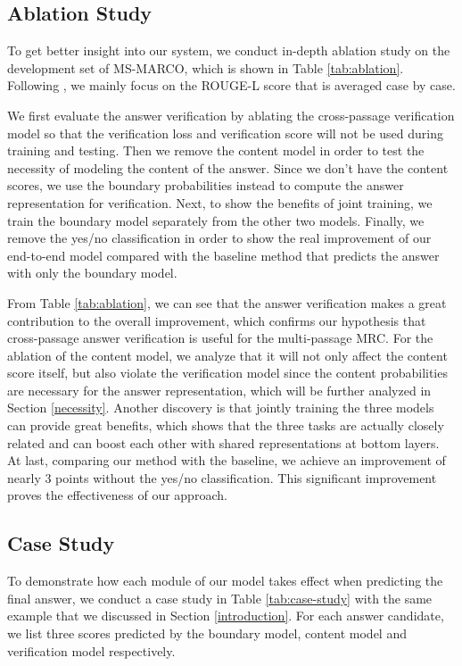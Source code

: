 \documentclass[11pt,a4paper]{article}
\newcommand{\tabref}[1]{Table \ref{#1}}
\newcommand{\secref}[1]{Section \ref{#1}}
\begin{document}
\subsection{Ablation Study}






To get better insight into our system, we conduct in-depth ablation study on the development set of MS-MARCO, which is shown in \tabref{tab:ablation}. Following , we mainly focus on the ROUGE-L score that is averaged case by case. 

We first evaluate the answer verification by ablating the cross-passage verification model so that the verification loss and verification score will not be used during training and testing. Then we remove the content model in order to test the necessity of modeling the content of the answer. Since we don't have the content scores, we use the boundary probabilities instead to compute the answer representation for verification. Next, to show the benefits of joint training, we train the boundary model separately from the other two models. Finally, we remove the yes/no classification in order to show the real improvement of our end-to-end model compared with the baseline method that predicts the answer with only the boundary model. 

From \tabref{tab:ablation}, we can see that the answer verification makes a great contribution to the overall improvement, which confirms our hypothesis that cross-passage answer verification is useful for the multi-passage MRC. For the ablation of the content model, we analyze that it will not only affect the content score itself, but also violate the verification model since the content probabilities are necessary for the answer representation, which will be further analyzed in \secref{necessity}. Another discovery is that jointly training the three models can provide great benefits, which shows that the three tasks are actually closely related and can boost each other with shared representations at bottom layers. At last, comparing our method with the baseline, we achieve an improvement of nearly 3 points without the yes/no classification. This significant improvement proves the effectiveness of our approach.

\subsection{Case Study}

To demonstrate how each module of our model takes effect when predicting the final answer, we conduct a case study in \tabref{tab:case-study} with the same example that we discussed in \secref{introduction}. For each answer candidate, we list three scores predicted by the boundary model, content model and verification model respectively. 
\end{document}

